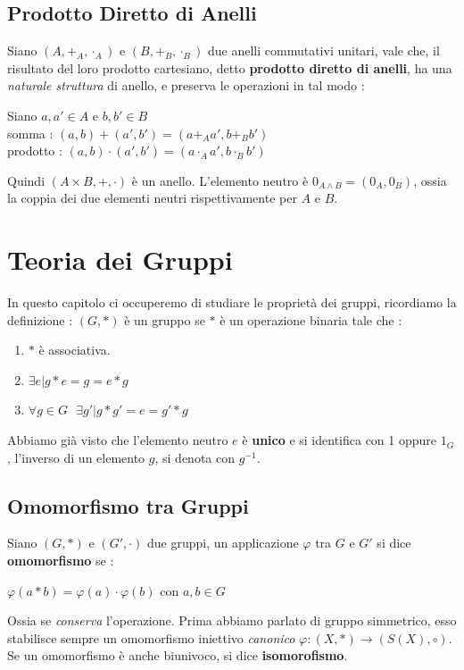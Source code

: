 \documentclass[12pt, letterpaper]{article}
\begin{document}
\subsection{Prodotto Diretto di Anelli}
Siano  \((A,+_A,\cdot_A)\) e \((B,+_B,\cdot_B)\) due anelli commutativi unitari, vale che, il risultato del loro
prodotto cartesiano, detto \textbf{prodotto diretto di anelli}, ha una \textit{naturale struttura} di anello, e preserva le operazioni in tal modo :\begin{center}
    Siano \(a,a'\in A\) e \(b,b'\in B\) \\
    somma : \((a,b)+(a',b')=(a+_A a',b+_B b')\)\\
    prodotto : \((a,b)\cdot(a',b')=(a\cdot_A a',b\cdot_B b')\)
\end{center}
Quindi \((A\times B,+,\cdot)\) è un anello.
L'elemento neutro è \(0_{A\land B}=(0_A,0_B)\), ossia la coppia dei due elementi neutri rispettivamente per \(A\) e \(B\).

\section{Teoria dei Gruppi}
In questo capitolo ci occuperemo di studiare le proprietà dei gruppi, ricordiamo la definizione :
\((G,*)\) è un gruppo se \(*\) è un operazione binaria tale che : \begin{enumerate}
    \item \(*\) è associativa.
    \item \(\exists e|g*e=g=e*g\)
    \item \(\forall g\in G \text{ } \exists g' | g*g'=e=g'*g\)
\end{enumerate}
Abbiamo già visto che l'elemento neutro \(e\) è \textbf{unico} e si identifica con 1 oppure \(1_G\), l'inverso di un 
elemento \(g\), si denota con \(g^{-1}\).
 \subsection{Omomorfismo tra Gruppi}
 Siano \((G,*)\) e \((G',\cdot)\) due gruppi, un applicazione \(\varphi\) tra \(G\) e \(G'\) si dice \textbf{omomorfismo}
  se :\begin{center}
    \(
        \varphi(a*b)=\varphi(a)\cdot \varphi(b) \text{ con }a,b\in G  
    \)
  \end{center}
Ossia se \textit{conserva} l'operazione. Prima abbiamo parlato di gruppo simmetrico, esso stabilisce sempre un 
omomorfismo iniettivo \textit{canonico} \(\varphi : (X,*)\rightarrow (S(X),\circ)\). Se un omomorfismo è anche 
biunivoco, si dice \textbf{isomorofismo}.
\end{document}
